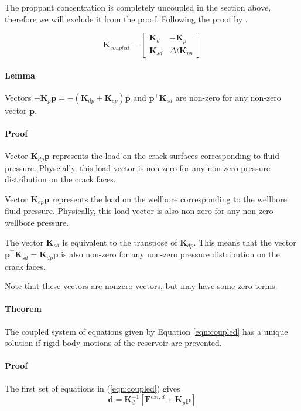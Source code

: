 \documentclass{article}
\begin{document}
The proppant concentration is completely uncoupled in the section above, therefore we will exclude it from the proof. 
Following the proof by \textcite{gupta_coupled_2016}.

\begin{equation}
	\mathbf{K}_{coupled} = 
	\begin{bmatrix}
		\mathbf{K}_{d} &
		- \mathbf{K}_{p} 
		\\
		\mathbf{K}_{sd} &
		\Delta t \mathbf{K}_{pp} 
	\end{bmatrix}
\end{equation}

\paragraph{Lemma}

Vectors $-\mathbf{K}_{p}\mathbf{p} = -(\mathbf{K}_{dp} + \mathbf{K}_{ep})\mathbf{p}$ and  $\mathbf{p}^{\top}\mathbf{K}_{sd}$ are non-zero for any non-zero vector $\mathbf{p}$.

\paragraph{Proof}
Vector $\mathbf{K}_{dp}\mathbf{p}$ represents the load on the crack surfaces corresponding to fluid pressure. 
Physcially, this load vector is non-zero for any non-zero pressure distribution on the crack faces.

Vector $\mathbf{K}_{ep}\mathbf{p}$ represents the load on the wellbore corresponding to the wellbore fluid pressure. 
Physically, this load vector is also non-zero for any non-zero wellbore pressure. 

The vector $\mathbf{K}_{sd}$ is equivalent to the transpose of $\mathbf{K}_{dp}$. 
This means that the vector $\mathbf{p}^{\top}\mathbf{K}_{sd}=\mathbf{K}_{dp} \mathbf{p}$ is also non-zero for any non-zero pressure distribution on the crack faces. 

Note that these vectors are nonzero vectors, but may have some zero terms. 

\paragraph{Theorem}
The coupled system of equations given by Equation \ref{eqn:coupled} has a unique solution if rigid body motions of the reservoir are prevented.

\paragraph{Proof}
The first set of equations in (\ref{eqn:coupled}) gives
\begin{equation}
	\mathbf{d} = \mathbf{K}_{d}^{-1}
	\left[
	\mathbf{F}^{ext,d} 
	+ \mathbf{K}_{p} \mathbf{p}
	\right]
	\label{eqn:d}
\end{equation}
\end{document}
